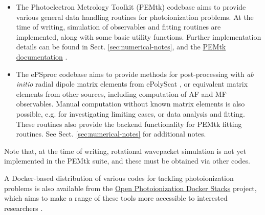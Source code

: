 \documentclass[10pt]{article}
\begin{document}
\begin{itemize}
\item The Photoelectron Metrology Toolkit (PEMtk) codebase \cite{hockett2021PEMtkDocs,hockett2021PEMtkGithub} aims to provide various general data handling routines for photoionization problems. At the time of writing, simulation of observables and fitting routines are implemented, along with some basic utility functions. Further implementation details can be found in Sect. \ref{sec:numerical-notes}, and the \href{https://pemtk.readthedocs.io/en/latest/about.html}{PEMtk documentation} \cite{hockett2021PEMtkDocs}.
\item The ePSproc codebase \cite{ePSprocAuthorea,ePSprocGithub,ePSprocDocs} aims to provide methods for post-processing with \textit{ab initio} radial dipole matrix elements from ePolyScat \cite{Lucchese1986,Gianturco1994,Natalense1999,luccheseEPolyScatUserManual}, or equivalent matrix elements from other sources, including computation of AF and MF observables. Manual computation without known matrix elements is also possible, e.g. for investigating limiting cases, or data analysis and fitting. These routines also provide the backend functionality for PEMtk fitting routines. See Sect. \ref{sec:numerical-notes} for additional notes.
\end{itemize}

Note that, at the time of writing, rotational wavepacket simulation is not yet implemented in the PEMtk suite, and these must be obtained via other codes. %

A Docker-based distribution of various codes for tackling photoionization problems is also available from the \href{https://github.com/phockett/open-photoionization-docker-stacks}{Open Photoionization Docker Stacks} project, which aims to make a range of these tools more accessible to interested researchers \cite{hockettOpenPhotoionizationDocker}.







\end{document}
